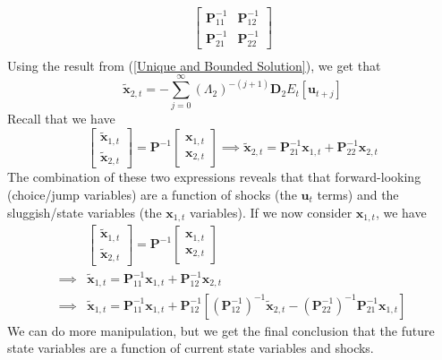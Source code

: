 \documentclass[12pt]{article}
\begin{document}
\begin{itemize}
\[\begin{split}
\begin{bmatrix}
        \textbf{P}_{11}^{-1} & \textbf{P}_{12}^{-1} \\
        \textbf{P}_{21}^{-1} & \textbf{P}_{22}^{-1}
        \end{bmatrix} \\ 
    \end{split}\]
    Using the result from (\ref{Unique and Bounded Solution}), we get that
    \[\boldsymbol{\widetilde{x}}_{2,t} = -\sum_{j=0}^{\infty}\left(\Lambda_2\right)^{-(j+1)}\textbf{D}_2E_t[\textbf{u}_{t+j}]\]
    Recall that we have
    \[\begin{bmatrix}
    \boldsymbol{\widetilde{x}}_{1,t} \\
    \boldsymbol{\widetilde{x}}_{2,t} 
    \end{bmatrix} = \textbf{P}^{-1}\begin{bmatrix}
    \textbf{x}_{1,t} \\
    \textbf{x}_{2,t}
    \end{bmatrix} \implies \boxed{\boldsymbol{\widetilde{x}}_{2,t} = \textbf{P}_{21}^{-1}\textbf{x}_{1,t} + \textbf{P}_{22}^{-1}\textbf{x}_{2,t}}\]
    The combination of these two expressions reveals that that forward-looking (choice/jump variables) are a function of shocks (the $\textbf{u}_t$ terms) and the sluggish/state variables (the $\textbf{x}_{1,t}$ variables). If we now consider $\textbf{x}_{1,t}$, we have
    \[\begin{split}
        &\begin{bmatrix}
        \boldsymbol{\widetilde{x}}_{1,t} \\
        \boldsymbol{\widetilde{x}}_{2,t} 
        \end{bmatrix} = \textbf{P}^{-1}\begin{bmatrix}
        \textbf{x}_{1,t} \\
        \textbf{x}_{2,t}
        \end{bmatrix}\\
        \implies &\boldsymbol{\widetilde{x}}_{1,t} = \textbf{P}_{11}^{-1}\textbf{x}_{1,t} + \textbf{P}_{12}^{-1}\textbf{x}_{2,t} \\
        \implies &\boldsymbol{\widetilde{x}}_{1,t} = \textbf{P}_{11}^{-1}\textbf{x}_{1,t} + \textbf{P}_{12}^{-1}\left[(\textbf{P}_{12}^{-1})^{-1}\boldsymbol{\widetilde{x}}_{2,t} - (\textbf{P}_{22}^{-1})^{-1}\textbf{P}_{21}^{-1}\textbf{x}_{1,t}\right]
    \end{split}\]
    We can do more manipulation, but we get the final conclusion that the future state variables are a function of current state variables and shocks.

\end{itemize}
\end{document}
